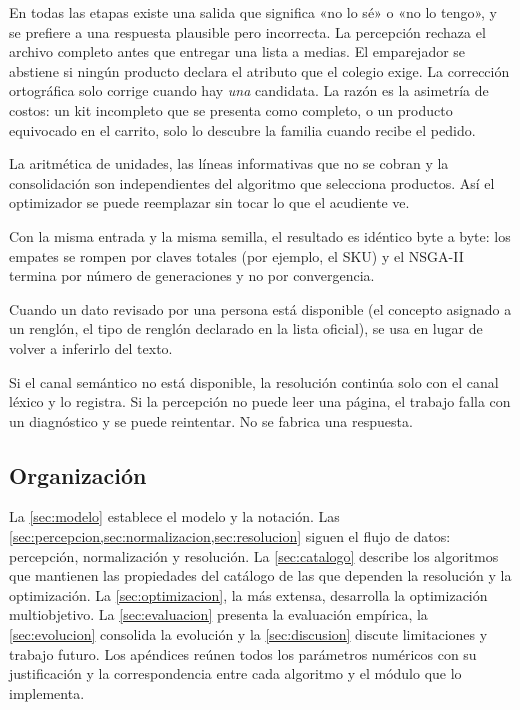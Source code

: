 \begin{description}[style=nextline]
  \item[Abstenerse es una respuesta válida.] En todas las etapas existe una
        salida que significa «no lo sé» o «no lo tengo», y se prefiere a una
        respuesta plausible pero incorrecta. La percepción rechaza el archivo
        completo antes que entregar una lista a medias. El emparejador se
        abstiene si ningún producto declara el atributo que el colegio exige.
        La corrección ortográfica solo corrige cuando hay \emph{una} candidata.
        La razón es la asimetría de costos: un kit incompleto que se presenta
        como completo, o un producto equivocado en el carrito, solo lo descubre
        la familia cuando recibe el pedido.
  \item[Separar decidir de presentar.] La aritmética de unidades, las líneas
        informativas que no se cobran y la consolidación son independientes del
        algoritmo que selecciona productos. Así el optimizador se puede
        reemplazar sin tocar lo que el acudiente ve.
  \item[Determinismo y reproducibilidad.] Con la misma entrada y la misma
        semilla, el resultado es idéntico byte a byte: los empates se rompen por
        claves totales (por ejemplo, el SKU) y el NSGA-II termina por número de
        generaciones y no por convergencia.
  \item[Lo curado manda sobre lo inferido.] Cuando un dato revisado por una
        persona está disponible (el concepto asignado a un renglón, el tipo de
        renglón declarado en la lista oficial), se usa en lugar de volver a
        inferirlo del texto.
  \item[Degradar en lugar de fallar, pero nunca en silencio.] Si el canal
        semántico no está disponible, la resolución continúa solo con el canal
        léxico y lo registra. Si la percepción no puede leer una página, el
        trabajo falla con un diagnóstico y se puede reintentar. No se
        fabrica una respuesta.
\end{description}

\subsection{Organización}

La \cref{sec:modelo} establece el modelo y la notación. Las
\cref{sec:percepcion,sec:normalizacion,sec:resolucion} siguen el flujo de
datos: percepción, normalización y resolución. La \cref{sec:catalogo} describe
los algoritmos que mantienen las propiedades del catálogo de las que dependen la
resolución y la optimización. La \cref{sec:optimizacion}, la más extensa,
desarrolla la optimización multiobjetivo. La \cref{sec:evaluacion} presenta la
evaluación empírica, la \cref{sec:evolucion} consolida la evolución y la
\cref{sec:discusion} discute limitaciones y trabajo futuro. Los apéndices
reúnen todos los parámetros numéricos con su justificación y la correspondencia
entre cada algoritmo y el módulo que lo implementa.
